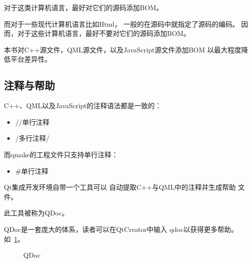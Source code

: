 对于这类计算机语言，最好对它们的源码添加BOM。

而对于一些现代计算机语言比如Html，
一般的在源码中就指定了源码的编码。
因而，对于这些计算机语言，最好不要对它们的源码添加BOM。

本书对C{\sourcefonttwo{}+}{\sourcefonttwo{}+}源文件，QML源文件，以及JavaScript源文件添加BOM
以最大程度降低平台差异性。

\FloatBarrier
\subsection{
注释与帮助
}\label{c000011s000000s02}


C{\sourcefonttwo{}+}{\sourcefonttwo{}+}、QML以及JavaScript的注释语法都是一致的：

\begin{itemize}
\item //单行注释
\item /\raisebox{-0.35ex}{\sourcefonttwo{}*}多行注释\raisebox{-0.35ex}{\sourcefonttwo{}*}/
\end{itemize}

而qmake的工程文件只支持单行注释：
\begin{itemize}
\item {\sourcefonttwo\#}单行注释
\end{itemize}



Qt集成开发环境自带一个工具可以
自动提取C{\sourcefonttwo{}+}{\sourcefonttwo{}+}与QML中的注释并生成帮助
文件。

此工具被称为QDoc。

QDoc是一套庞大的体系，读者可以在QtCreator中输入
qdoc以获得更多帮助。
如\figurename\ \ref{p000043}。

\begin{figure}[htb] %
\marginnote{\setlength\fboxsep{2pt}\fbox{\footnotesize{\kaishu\figurename\,}\footnotesize{\ref{p000043}}}}\centering %
\setlength\fboxsep{0pt} %
\caption{QDoc} %
\label{p000043} %
\end{figure}










